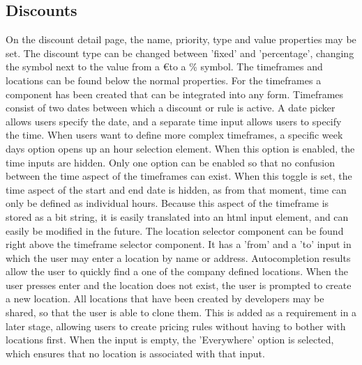 \subsection{Discounts}
On the discount detail page, the name, priority, type and value properties may be set. The discount type can be changed between 'fixed' and 'percentage', changing the symbol next to the value from a \euro\quad to a \% symbol. The timeframes and locations can be found below the normal properties. For the timeframes a component has been created that can be integrated into any form. Timeframes consist of two dates between which a discount or rule is active. A date picker allows users specify the date, and a separate time input allows users to specify the time. When users want to define more complex timeframes, a specific week days option opens up an hour selection element. When this option is enabled, the time inputs are hidden. Only one option can be enabled so that no confusion between the time aspect of the timeframes can exist. When this toggle is set, the time aspect of the start and end date is hidden, as from that moment, time can only be defined as individual hours. Because this aspect of the timeframe is stored as a bit string, it is easily translated into an html input element, and can easily be modified in the future. The location selector component can be found right above the timeframe selector component. It has a 'from' and a 'to' input in which the user may enter a location by name or address. Autocompletion results allow the user to quickly find a one of the company defined locations. When the user presses enter and the location does not exist, the user is prompted to create a new location. All locations that have been created by developers may be shared, so that the user is able to clone them. This is added as a requirement in a later stage, allowing users to create pricing rules without having to bother with locations first. When the input is empty, the 'Everywhere' option is selected, which ensures that no location is associated with that input.

